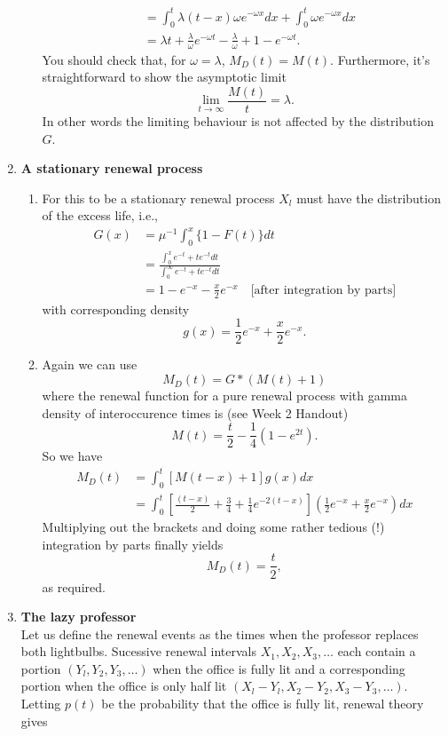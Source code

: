 \documentclass[11pt,a4paper]{article}
\begin{document}
\begin{enumerate}
\begin{enumerate}
\begin{align*}
        &= \int_0^t\lambda (t - x)\omega e^{-\omega x}dx + \int_0^t\omega e^{-\omega x}dx\\
        &= \lambda t + \frac{\lambda}{\omega}e^{-\omega t} - \frac{\lambda}{\omega} + 1 - e^{-\omega t}.
      \end{align*}
      You should check that, for $\omega = \lambda$, $M_D(t) = M(t)$. Furthermore, it's straightforward to show the asymptotic limit
      $$
      \lim_{t\to\infty}\frac{M(t)}{t} = \lambda.
      $$
      In other words the limiting behaviour is not affected by the distribution $G$.
    \end{enumerate}
    \item \textbf{A stationary renewal process}
    \begin{enumerate}
      \item For this to be a stationary renewal process $X_l$ must have the distribution of the excess life, i.e.,
      \begin{align*}
        G(x)
        &= \mu^{-1}\int_0^x\{1 - F(t)\}dt\\
        &= \frac{\int_0^x e^{-t} + te^{-t}dt}{\int_0^\infty e^{-t} + te^{-t}dt}\\
        &= 1 - e^{-x} - \frac{x}{2}e^{-x}\quad\text{[after integration by parts]}
      \end{align*}
      with corresponding density
      $$
      g(x) = \frac{1}{2}e^{-x} + \frac{x}{2}e^{-x}.
      $$
      \item Again we can use
      $$
      M_D(t) = G * (M(t) + 1)
      $$
      where the renewal function for a pure renewal process with gamma density of interoccurence times is (see Week 2 Handout)
      $$
      M(t) = \frac{t}{2} - \frac{1}{4}(1 - e^{2t}).
      $$
      So we have
      \begin{align*}
        M_D(t)
        &= \int_0^t[M(t - x) + 1]g(x)dx\\
        &= \int_0^t\left[\frac{(t - x)}{2} + \frac{3}{4} + \frac{1}{4}e^{-2(t - x)}\right]\left(\frac{1}{2}e^{-x} + \frac{x}{2}e^{-x}\right)dx
      \end{align*}
      Multiplying out the brackets and doing some rather tedious (!) integration by parts finally yields
      $$
      M_D(t) = \frac{t}{2},
      $$
      as required.
    \end{enumerate}
    \item \textbf{The lazy professor}\\
    Let us define the renewal events as the times when the professor replaces both lightbulbs. Sucessive renewal intervals $X_1, X_2, X_3, \ldots$ each contain a portion $(Y_l, Y_2, Y_3, \ldots)$ when the office is fully lit and a corresponding portion when the office is only half lit $(X_l - Y_l, X_2 - Y_2, X_3 - Y_3,\ldots)$. Letting $p(t)$ be the probability that the office is fully lit, renewal theory gives

\end{enumerate}
\end{document}
